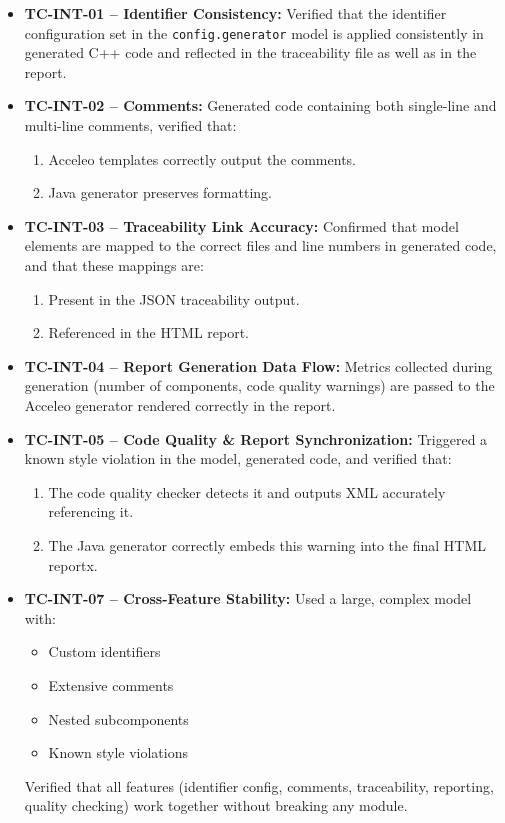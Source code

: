 \begin{itemize}
	\item \textbf{TC-INT-01 – Identifier Consistency:} Verified that the identifier configuration set in the \texttt{config.generator} model is applied consistently in generated C++ code and reflected in the traceability file as well as in the report.
	
	\item \textbf{TC-INT-02 – Comments:} Generated code containing both single-line and multi-line comments, verified that:
	\begin{enumerate}
		\item Acceleo templates correctly output the comments.
		\item Java generator preserves formatting.
	\end{enumerate}
	
	\item \textbf{TC-INT-03 – Traceability Link Accuracy:} Confirmed that model elements are mapped to the correct files and line numbers in generated code, and that these mappings are:
	\begin{enumerate}
		\item Present in the \gls{JSON} traceability output.
		\item Referenced in the \gls{HTML} report.
	\end{enumerate}
	
	\item \textbf{TC-INT-04 – Report Generation Data Flow:} Metrics collected during generation (number of components, code quality warnings) are passed to the Acceleo generator rendered correctly in the report.
	
	\item \textbf{TC-INT-05 – Code Quality \& Report Synchronization:} Triggered a known style violation in the model, generated code, and verified that:
	\begin{enumerate}
		\item The code quality checker detects it and outputs XML accurately referencing it.
		\item The Java generator correctly embeds this warning into the final HTML reportx.
	\end{enumerate}
	
	\item \textbf{TC-INT-07 – Cross-Feature Stability:} Used a large, complex model with:
	\begin{itemize}
		\item Custom identifiers
		\item Extensive comments
		\item Nested subcomponents
		\item Known style violations
	\end{itemize}
	Verified that all features (identifier config, comments, traceability, reporting, quality checking) work together without breaking any module.
\end{itemize}


